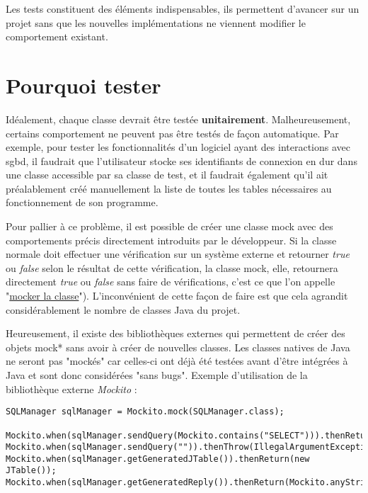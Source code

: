 Les tests constituent des éléments indispensables, ils permettent d'avancer sur un projet sans que les nouvelles implémentations ne viennent modifier le comportement existant.
\section{Pourquoi tester}


Idéalement, chaque classe devrait être testée \textbf{unitairement}.
Malheureusement, certains comportement ne peuvent pas être testés  de façon automatique. Par exemple, pour tester les fonctionnalités d'un logiciel ayant des interactions avec \gls{sgbd}, il faudrait que l'utilisateur stocke ses identifiants de connexion en dur dans une classe accessible par sa classe de test, et il faudrait également qu'il ait préalablement créé manuellement la liste de toutes les tables nécessaires au fonctionnement de son programme.
\bigbreak

Pour pallier à ce problème, il est possible de créer une classe mock avec des comportements précis directement introduits par le développeur. Si la classe normale doit effectuer une vérification sur un système externe et retourner \textit{true} ou \textit{false} selon le résultat de cette vérification, la classe mock, elle, retournera directement \textit{true} ou \textit{false} sans faire de vérifications, c'est ce que l'on appelle "\underline{mocker la classe}"). L'inconvénient de cette façon de faire est que cela agrandit considérablement le nombre de classes Java du projet.


\bigbreak
  Heureusement, il existe des bibliothèques externes qui permettent de créer des objets \gls{mock}* sans avoir à créer de nouvelles classes.
Les classes natives de Java ne seront pas "mockés" car celles-ci ont déjà été testées avant d'être intégrées à Java et sont donc considérées "sans bugs".
\bigbreak
Exemple d'utilisation de la bibliothèque externe \textit{Mockito} :

\begin{lstlisting}
SQLManager sqlManager = Mockito.mock(SQLManager.class);

Mockito.when(sqlManager.sendQuery(Mockito.contains("SELECT"))).thenReturn(true);
Mockito.when(sqlManager.sendQuery("")).thenThrow(IllegalArgumentException.class);
Mockito.when(sqlManager.getGeneratedJTable()).thenReturn(new JTable());
Mockito.when(sqlManager.getGeneratedReply()).thenReturn(Mockito.anyString());

\end{lstlisting}
\bigbreak

